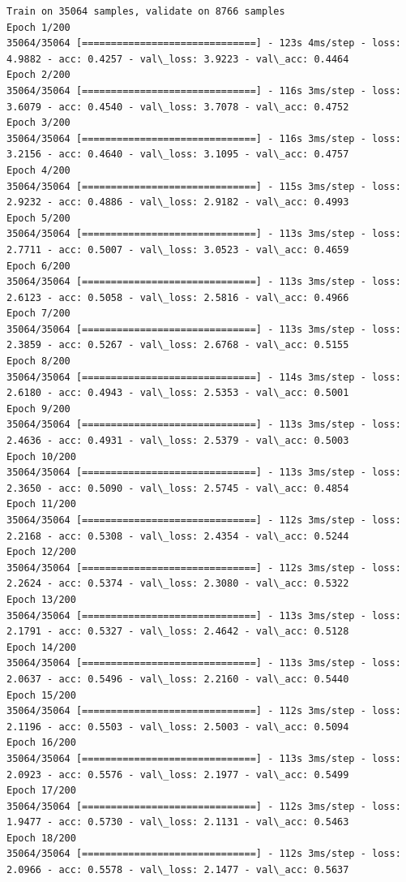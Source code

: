 \documentclass[11pt]{article}
\begin{document}
    \begin{Verbatim}[commandchars=\\\{\}]
Train on 35064 samples, validate on 8766 samples
Epoch 1/200
35064/35064 [==============================] - 123s 4ms/step - loss: 4.9882 - acc: 0.4257 - val\_loss: 3.9223 - val\_acc: 0.4464
Epoch 2/200
35064/35064 [==============================] - 116s 3ms/step - loss: 3.6079 - acc: 0.4540 - val\_loss: 3.7078 - val\_acc: 0.4752
Epoch 3/200
35064/35064 [==============================] - 116s 3ms/step - loss: 3.2156 - acc: 0.4640 - val\_loss: 3.1095 - val\_acc: 0.4757
Epoch 4/200
35064/35064 [==============================] - 115s 3ms/step - loss: 2.9232 - acc: 0.4886 - val\_loss: 2.9182 - val\_acc: 0.4993
Epoch 5/200
35064/35064 [==============================] - 113s 3ms/step - loss: 2.7711 - acc: 0.5007 - val\_loss: 3.0523 - val\_acc: 0.4659
Epoch 6/200
35064/35064 [==============================] - 113s 3ms/step - loss: 2.6123 - acc: 0.5058 - val\_loss: 2.5816 - val\_acc: 0.4966
Epoch 7/200
35064/35064 [==============================] - 113s 3ms/step - loss: 2.3859 - acc: 0.5267 - val\_loss: 2.6768 - val\_acc: 0.5155
Epoch 8/200
35064/35064 [==============================] - 114s 3ms/step - loss: 2.6180 - acc: 0.4943 - val\_loss: 2.5353 - val\_acc: 0.5001
Epoch 9/200
35064/35064 [==============================] - 113s 3ms/step - loss: 2.4636 - acc: 0.4931 - val\_loss: 2.5379 - val\_acc: 0.5003
Epoch 10/200
35064/35064 [==============================] - 113s 3ms/step - loss: 2.3650 - acc: 0.5090 - val\_loss: 2.5745 - val\_acc: 0.4854
Epoch 11/200
35064/35064 [==============================] - 112s 3ms/step - loss: 2.2168 - acc: 0.5308 - val\_loss: 2.4354 - val\_acc: 0.5244
Epoch 12/200
35064/35064 [==============================] - 112s 3ms/step - loss: 2.2624 - acc: 0.5374 - val\_loss: 2.3080 - val\_acc: 0.5322
Epoch 13/200
35064/35064 [==============================] - 113s 3ms/step - loss: 2.1791 - acc: 0.5327 - val\_loss: 2.4642 - val\_acc: 0.5128
Epoch 14/200
35064/35064 [==============================] - 113s 3ms/step - loss: 2.0637 - acc: 0.5496 - val\_loss: 2.2160 - val\_acc: 0.5440
Epoch 15/200
35064/35064 [==============================] - 112s 3ms/step - loss: 2.1196 - acc: 0.5503 - val\_loss: 2.5003 - val\_acc: 0.5094
Epoch 16/200
35064/35064 [==============================] - 113s 3ms/step - loss: 2.0923 - acc: 0.5576 - val\_loss: 2.1977 - val\_acc: 0.5499
Epoch 17/200
35064/35064 [==============================] - 112s 3ms/step - loss: 1.9477 - acc: 0.5730 - val\_loss: 2.1131 - val\_acc: 0.5463
Epoch 18/200
35064/35064 [==============================] - 112s 3ms/step - loss: 2.0966 - acc: 0.5578 - val\_loss: 2.1477 - val\_acc: 0.5637

\end{Verbatim}
\end{document}

